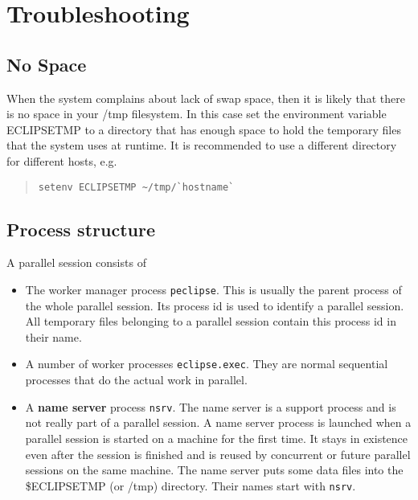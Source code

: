 
\section{Troubleshooting}
\subsection{No Space}
When the system complains about lack of swap space, then it is likely
that there is no space in your /tmp filesystem. In this case set
the environment variable ECLIPSETMP to a directory that has enough space
to hold the temporary files that the system uses at runtime.
It is recommended to use a different directory for different hosts,
e.g.
\begin{quote}\begin{verbatim}
setenv ECLIPSETMP ~/tmp/`hostname`
\end{verbatim}\end{quote}

\subsection{Process structure}
A parallel {\eclipse} session consists of
\begin{itemize}
\item The worker manager process {\tt peclipse}.
This is usually the parent process of the whole parallel session.
Its process id is used to identify a parallel session.
All temporary files belonging to a parallel session contain this
process id in their name.
\item A number of worker processes {\tt eclipse.exec}.
They are normal sequential {\eclipse} processes that do the actual
work in parallel.
\item A {\bf name server} process {\tt nsrv}.
The name server is a support process and is not really part of a
parallel {\eclipse} session.
A name server process is launched when
a parallel session is started on a machine for the first time.
It stays in existence even after the session is finished and is reused
by concurrent or future parallel sessions on the same machine.
The name server puts some data files into the \$ECLIPSETMP (or /tmp)
directory. Their names start with {\tt nsrv}.
\end{itemize}

